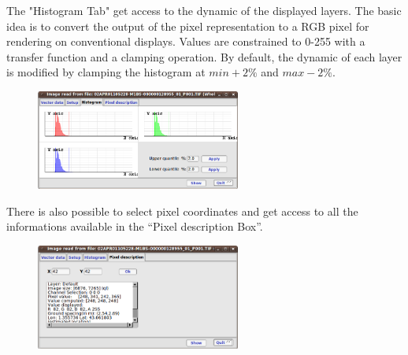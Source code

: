 The "Histogram Tab" get access to the dynamic of the displayed
layers. The basic idea is to convert the output of the pixel
representation to a RGB pixel for rendering on conventional displays.
Values are constrained to 0-255 with a transfer function and a clamping
operation.  By default, the dynamic of each layer is modified by
clamping the histogram at $min + 2\%$ and $max - 2\%$.

\begin{figure}
  \center
  \includegraphics[width=0.6\textwidth]{../Art/MonteverdiImages/monteverdi_viewer_histogram.png}
  \label{fig:histogram}
\end{figure}

There is also possible to select pixel coordinates and get access to all the informations available in the ``Pixel description 
Box''.

\begin{figure}
  \center
  \includegraphics[width=0.6\textwidth]{../Art/MonteverdiImages/monteverdi_viewer_pixel_description.png}
  \label{fig:pixeldescriptioninformations}
\end{figure}

